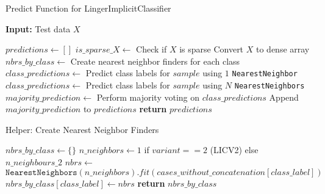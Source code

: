 \documentclass[a4paper, 12pt]{report}
\begin{document}
\begin{algorithm}[H]
    \caption{Predict Function for LingerImplicitClassifier}
    \textbf{Input:} Test data $X$
    \label{alg:linger_implicit_classifier_predict}
    \begin{algorithmic}[1]
            \State $predictions \gets []$
            \State $is\_sparse\_X \gets$ Check if $X$ is sparse
                \State Convert $X$ to dense array
            \EndIf
            \State $nbrs\_by\_class \gets$ Create nearest neighbor finders for each class
                    \State $class\_predictions \gets$ Predict class labels for $sample$ using $1$ \texttt{NearestNeighbor}
                \Else
                    \State $class\_predictions \gets$ Predict class labels for $sample$ using $N$ \texttt{NearestNeighbors}
                \EndIf
                \State $majority\_prediction \gets$ Perform majority voting on $class\_predictions$
                \State Append $majority\_prediction$ to $predictions$
            \EndFor
            \State \textbf{return} $predictions$
        \EndFunction
    \end{algorithmic}
\end{algorithm}

\begin{algorithm}[H]
    \caption{Helper: Create Nearest Neighbor Finders}
    \label{alg:create_nbrs_by_class}
    \begin{algorithmic}[1]
            \State $nbrs\_by\_class \gets \{\}$
                \State $n\_neighbors \gets 1$ if $variant == 2$ (LICV2) else $n\_neighbours\_2$
                \State $nbrs \gets$ $\texttt{NearestNeighbors}(n\_neighbors).fit(cases\_without\_concatenation[class\_label])$
                \State $nbrs\_by\_class[class\_label] \gets nbrs$
            \EndFor
            \State \textbf{return} $nbrs\_by\_class$
        \EndFunction
    \end{algorithmic}
\end{algorithm}
\end{document}
